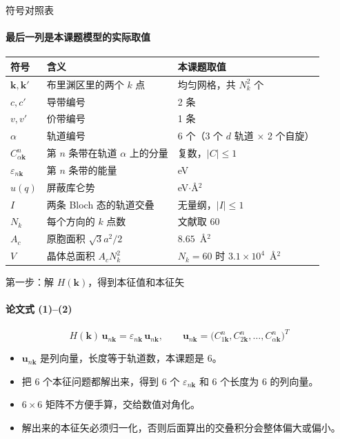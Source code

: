 \documentclass[aspectratio=169,11pt]{ctexbeamer}
\newcommand{\eps}{\varepsilon}
\newcommand{\kk}{\mathbf{k}}
\newcommand{\kq}{\mathbf{k}'}
\begin{document}
\begin{frame}{符号对照表}
  \framesubtitle{最后一列是本课题模型的实际取值}
  \centering
  \footnotesize
  \begin{tabular}{@{}lll@{}}
    \toprule
    符号 & 含义 & 本课题取值\\
    \midrule
    $\kk,\kq$ & 布里渊区里的两个 $k$ 点 & 均匀网格，共 $N_k^2$ 个\\
    $c,c'$ & 导带编号 & 2 条\\
    $v,v'$ & 价带编号 & 1 条\\
    $\alpha$ & 轨道编号 & 6 个（3 个 $d$ 轨道 $\times$ 2 个自旋）\\
    $C^{n}_{\alpha\kk}$ & 第 $n$ 条带在轨道 $\alpha$ 上的分量 & 复数，$|C|\le1$\\
    $\eps_{n\kk}$ & 第 $n$ 条带的能量 & eV\\
    $u(q)$ & 屏蔽库仑势 & eV$\cdot$\AA$^2$\\
    $I$ & 两条 Bloch 态的轨道交叠 & 无量纲，$|I|\le1$\\
    $N_k$ & 每个方向的 $k$ 点数 & 文献取 60\\
    $A_c$ & 原胞面积 $\sqrt3a^2/2$ & $8.65$~\AA$^2$\\
    $V$ & 晶体总面积 $A_cN_k^2$ & $N_k=60$ 时 $3.1\times10^4$~\AA$^2$\\
    \bottomrule
  \end{tabular}
\end{frame}


\begin{frame}{第一步：解 $H(\kk)$，得到本征值和本征矢}
  \framesubtitle{论文式 (1)--(2)}
  \begin{equation*}
    H(\kk)\,\mathbf u_{n\kk}=\eps_{n\kk}\,\mathbf u_{n\kk},
    \qquad
    \mathbf u_{n\kk}=\big(C^{n}_{1\kk},C^{n}_{2\kk},\dots,C^{n}_{\alpha\kk}\big)^{T}
  \end{equation*}
  \begin{itemize}
    \item $\mathbf u_{n\kk}$ 是列向量，长度等于轨道数，本课题是 6。
    \item 把 6 个本征问题都解出来，得到 6 个 $\eps_{n\kk}$ 和 6 个长度为 6 的列向量。
    \item $6\times6$ 矩阵不方便手算，交给数值对角化。
    \item 解出来的本征矢必须归一化，否则后面算出的交叠积分会整体偏大或偏小。
  \end{itemize}
\end{frame}
\end{document}
